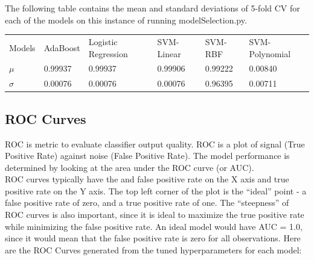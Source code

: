 \documentclass[fleqn]{article}
\begin{document}
    The following table contains the mean and standard deviations of 5-fold CV for each of
    the models on this instance of running modelSelection.py.\\
    \begin{center}
        \begin{tabular}{llllll}
        Models   & AdaBoost & Logistic Regression & SVM-Linear & SVM-RBF & SVM-Polynomial \\
        $\mu$    & 0.99937  & 0.99937             & 0.99906    & 0.99222 & 0.00840        \\
        $\sigma$ & 0.00076  & 0.00076             & 0.00076    & 0.96395 & 0.00711
        \end{tabular}
    \end{center}

    \subsection{ROC Curves}
    ROC is metric to evaluate classifier output quality. ROC is a plot of signal (True
    Positive Rate) against noise (False Positive Rate). The model performance is
    determined by looking at the area under the ROC curve (or AUC).\\

    ROC curves typically have the and false positive rate on the X axis and true positive
    rate on the Y axis. The top left corner of the plot is the “ideal” point - a false
    positive rate of zero, and a true positive rate of one. The “steepness” of ROC curves
    is also important, since it is ideal to maximize the true positive rate while
    minimizing the false positive rate. An ideal model would have AUC = 1.0, since it would
    mean that the false positive rate is zero for all observations. Here are the ROC
    Curves generated from the tuned hyperparameters for each model:
\end{document}
